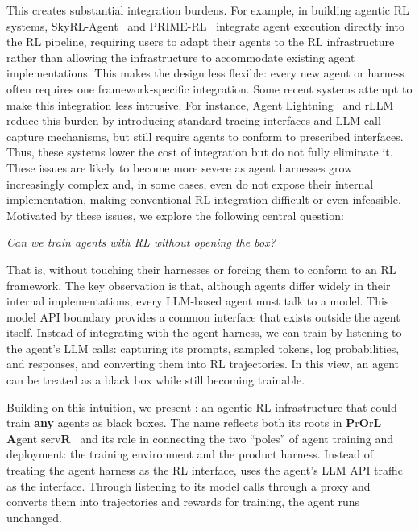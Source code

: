 This creates substantial integration burdens. For example, in building agentic RL systems, SkyRL-Agent~\citep{skyrlagent2025} and PRIME-RL~\citep{primerl2026} integrate agent execution directly into the RL pipeline, requiring users to adapt their agents to the RL infrastructure rather than allowing the infrastructure to accommodate existing agent implementations.
This makes the design less flexible: every new agent or harness often requires one framework-specific integration.
Some recent systems attempt to make this integration less intrusive. For instance, Agent Lightning~\citep{agentlightning2025} and rLLM~\citep{rllm2025} reduce this burden by introducing standard tracing interfaces and LLM-call capture mechanisms, but still require agents to conform to prescribed interfaces. Thus, these systems lower the cost of integration but do not fully eliminate it.
These issues are likely to become more severe as agent harnesses grow increasingly complex and, in some cases, even do not expose their internal implementation, making conventional RL integration difficult or even infeasible. Motivated by
these issues, we explore the following central question:

\begin{center}
    \emph{Can we train agents with RL without opening the box?}
\end{center}

That is, without touching their harnesses or forcing them to conform to an RL framework.
The key observation is that, although agents differ widely in their internal implementations, every LLM-based agent must talk to a model. This model API boundary provides a common interface that exists outside the agent itself.
Instead of integrating with the agent harness, we can train by listening to the agent’s LLM calls: capturing its prompts, sampled tokens, log probabilities, and responses, and converting them into RL trajectories. In this view, an agent can be treated as a black box while still becoming trainable.

Building on this intuition, we present \polar: an agentic RL infrastructure that could train \textbf{any} agents as black boxes. The name \polar reflects both its roots in \textbf{P}r\textbf{O}r\textbf{L} \textbf{A}gent serv\textbf{R}~\citep{prorlagent2026} and its role in connecting the two ``poles'' of agent training and deployment: the training environment and the product harness. Instead of treating the agent harness as the RL interface, \polar uses the agent’s LLM API traffic as the interface. Through listening to its model calls through a proxy and converts them into trajectories and rewards for training, the agent runs unchanged.


